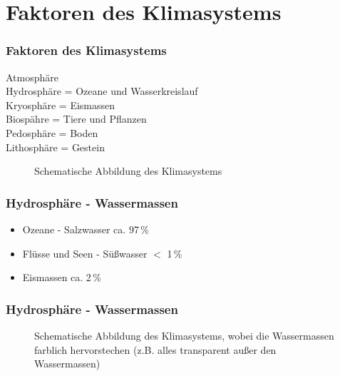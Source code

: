 \section{Faktoren des Klimasystems}


\begin{frame}
  \frametitle{Faktoren des Klimasystems}
  Atmosphäre \\
  Hydrosphäre = Ozeane und Wasserkreislauf \\
  Kryosphäre = Eismassen \\
  Biospähre = Tiere und Pflanzen \\
  Pedosphäre = Boden \\
  Lithosphäre = Gestein 
  
  \begin{figure}
  	\caption{Schematische Abbildung des Klimasystems}
  \end{figure}
\end{frame}


\begin{frame}
	\frametitle{Hydrosphäre - Wassermassen}
	\begin{itemize}
		\item Ozeane - Salzwasser ca. 97\,\%
		\item Flüsse und Seen - Süßwasser $<$ 1\,\%
		\item Eismassen ca. 2\,\% %
	\end{itemize}
\end{frame}

\begin{frame}
	\frametitle{Hydrosphäre - Wassermassen}
	
	\begin{figure}
		\caption{Schematische Abbildung des Klimasystems, wobei die Wassermassen farblich hervorstechen (z.B. alles transparent außer den Wassermassen)}
	\end{figure}
\end{frame}


